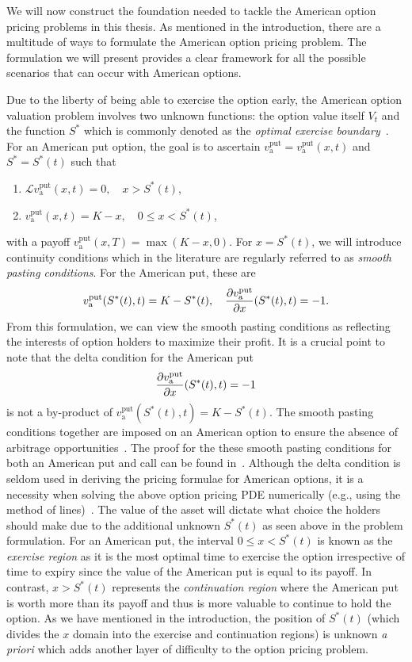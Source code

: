 We will now construct the foundation needed to tackle the American option pricing problems in this thesis.
As mentioned in the introduction, there are a multitude of ways to formulate the American option pricing problem. The formulation we will present provides a clear framework for all the possible scenarios that can occur with American options.

Due to the liberty of being able to exercise the option early, the American option valuation problem involves two unknown functions: the option value itself $V_t$ and
the function $S^*$ which is commonly denoted as the \emph{optimal exercise boundary}~\cite{Kwok2008}. For an American put option, the goal is to ascertain
$v_\text{a}^{\text{put}} =v_\text{a}^{\text{put}}(x,t)$ and $S^* = S^*(t)$ such that
	\begin{enumerate}
			\item $\mathscr{L}v_\text{a}^{\text{put}}(x,t) = 0, \quad x > S^*(t)$,
			\item $v_\text{a}^{\text{put}}(x,t) = K - x, \quad 0 \leq x < S^*(t)$,
	\end{enumerate}
	with a payoff $v_\text{a}^{\text{put}}(x,T) = \max(K-x,0)$. For $x = S^*(t)$, we will introduce continuity conditions which in the literature are regularly referred to as \emph{smooth pasting conditions}. For the American put, these are
		\begin{equation*}
			v_\text{a}^{\text{put}}(S^*(t),t) = K - S^*(t), \quad \frac{\partial v_\text{a}^{\text{put}}}{\partial x}(S^*(t),t) = -1.
		\end{equation*}
	From this formulation, we can view the smooth pasting conditions as reflecting the interests of option holders to maximize their profit. It is a crucial point to note that the delta condition for the American put
	$$
	\frac{\partial v_\text{a}^{\text{put}}}{\partial x}(S^*(t),t) = -1
	$$
is not a by-product of $v_\text{a}^{\text{put}}(S^*(t),t) = K - S^*(t)$. The smooth pasting conditions together are imposed on an American option to ensure the absence of arbitrage opportunities~\cite{Chiarella2014}. The proof for the these smooth pasting conditions for both an American put and call can be found in~\cite{Chin2017}. Although the delta condition is seldom used in deriving the pricing formulae for American options, it is a necessity when solving the above option pricing PDE numerically (e.g., using the method of lines)~\cite{Chiarella2010}. The value of the asset will dictate what choice the holders should make due to the additional unknown $S^*(t)$ as seen above in the problem formulation. For an American put, the interval $0 \leq x < S^*(t)$ is known as the \emph{exercise region} as it is the most optimal time to exercise the option irrespective of time to expiry since the value of the American put is equal to its payoff. In contrast, $x > S^*(t)$ represents the \emph{continuation region} where the American put is worth more than its payoff and thus is more valuable to continue to hold the option. As we have mentioned in the introduction, the position of $S^*(t)$ (which divides the $x$ domain into the exercise and continuation regions) is unknown \emph{a priori} which adds another layer of difficulty to the option pricing problem.
	
